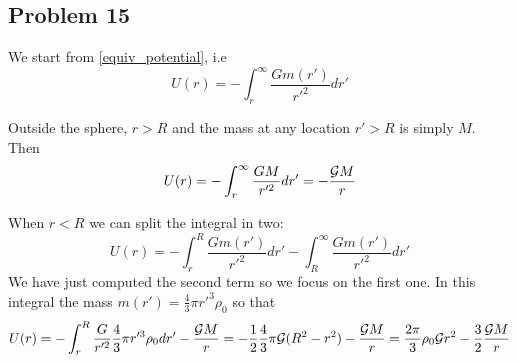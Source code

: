 \subsection{Problem 15}

We start from \eqref{equiv_potential}, i.e
\[
U(r)   = - \int_r^{\infty} \frac{Gm(r')}{r'^2} dr'
\]

Outside the sphere, $r>R$ and the mass at any location $r'>R$ is simply $M$.
Then 
\[
U(r)   = - \int_r^{\infty} \frac{GM}{r'^2} dr' = -\frac{{\cal G}M}{r}
\]


When $r<R$ we can split the integral in two:
\[
U(r)   = - \int_r^{R} \frac{Gm(r')}{r'^2} dr'  - \int_R^{\infty} \frac{Gm(r')}{r'^2} dr'
\]
We have just computed the second term so we focus on the first one. In this integral the mass 
$m(r')= \frac{4}{3}\pi r'^3 \rho_0$ so that 
\[
U(r)   = - \int_r^{R} \frac{G}{r'^2} \frac{4}{3}\pi r'^3 \rho_0  dr'   -\frac{{\cal G}M}{r} 
=-\frac{1}{2} \frac{4}{3}\pi {\cal G} (R^2-r^2)  -\frac{{\cal G}M}{r}
= \frac{2\pi}{3} \rho_0 {\cal G} r^2 - \frac{3}{2} \frac{{\cal G}M}{r}
\]


